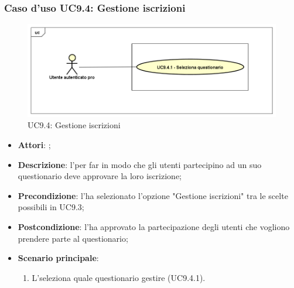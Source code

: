 	 \subsubsection{Caso d'uso UC9.4: Gestione iscrizioni}
	 \label{UC9.4}
	 \begin{figure}[h]
	 	\centering
	 	\includegraphics[scale=0.5,keepaspectratio]{UML/UC9_4.png}
	 	\caption{UC9.4: Gestione iscrizioni}
	 \end{figure}
	 \FloatBarrier
	 \begin{itemize}
	 	\item \textbf{Attori}: \uaupro;
	 	\item \textbf{Descrizione}: l'\uaupro per far in modo che gli utenti partecipino ad un suo questionario deve approvare la loro iscrizione;
	 	\item \textbf{Precondizione}: l'\uaupro ha selezionato l'opzione "Gestione iscrizioni" tra le scelte possibili in UC9.3;
	 	\item \textbf{Postcondizione}: l'\uaupro ha approvato la partecipazione degli utenti che vogliono prendere parte al questionario;
	 	\item \textbf{Scenario principale}: 
	 	\begin{enumerate}
	 		\item L'\uaupro seleziona quale questionario gestire (UC9.4.1).
	 	\end{enumerate}
	 \end{itemize}
	 
